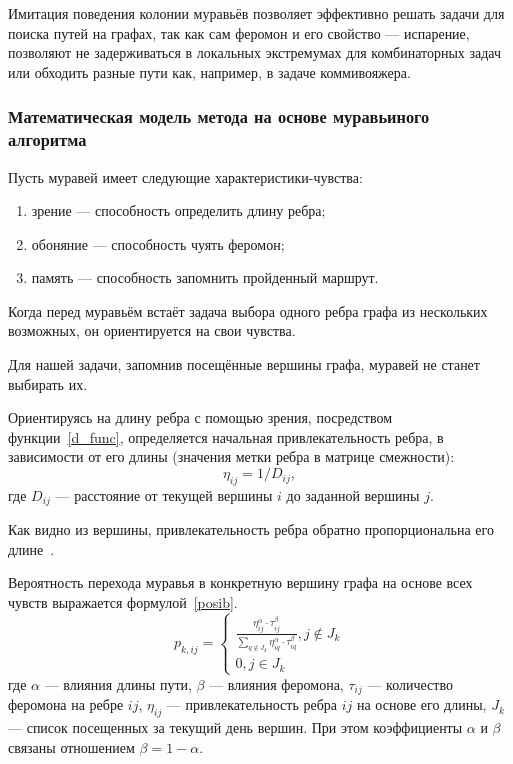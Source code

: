 Имитация поведения колонии муравьёв позволяет эффективно решать задачи для поиска путей на графах, так как сам феромон и его свойство --- испарение, позволяют не задерживаться в локальных экстремумах для комбинаторных задач или обходить разные пути как, например, в задаче коммивояжера.

\subsubsection{Математическая модель метода на основе муравьиного алгоритма}
Пусть муравей имеет следующие характеристики-чувства:
\begin{enumerate}[label=\arabic*)]
	\item зрение --- способность определить длину ребра;
	\item обоняние --- способность чуять феромон;
	\item память --- способность запомнить пройденный маршрут.
\end{enumerate}

Когда перед муравьём встаёт задача выбора одного ребра графа из нескольких возможных, он ориентируется на свои чувства.

Для нашей задачи, запомнив посещённые вершины графа, муравей не станет выбирать их.

Ориентируясь на длину ребра с помощью зрения, посредством функции~\eqref{d_func}, определяется начальная привлекательность ребра, в зависимости от его длины (значения метки ребра в матрице смежности):
\begin{equation}
	\label{d_func}
	\eta_{ij} = 1 / D_{ij},
\end{equation}
где $D_{ij}$ — расстояние от текущей вершины $i$ до заданной вершины $j$.

Как видно из вершины, привлекательность ребра обратно пропорциональна его длине~\cite{antAlgs}.

Вероятность перехода муравья в конкретную вершину графа на основе всех чувств выражается формулой~\eqref{posib}.
\begin{equation}
	\label{posib}
	p_{k,ij} = \begin{cases}
		\frac{\eta_{ij}^{\alpha}\cdot\tau_{ij}^{\beta}}{\sum_{q\notin J_k} \eta^\alpha_{iq}\cdot\tau^\beta_{iq}}, j \notin J_k \\
		0, j \in J_k
	\end{cases}
\end{equation}
где $\alpha$ --- влияния длины пути, $\beta$ --- влияния феромона, $\tau_{ij}$ --- количество феромона на ребре $ij$, $\eta_{ij}$ --- привлекательность ребра $ij$ на основе его длины, $J_k$ --- список посещенных за текущий день вершин. При этом коэффициенты $\alpha$ и $\beta$ связаны отношением $\beta = 1 - \alpha$.

